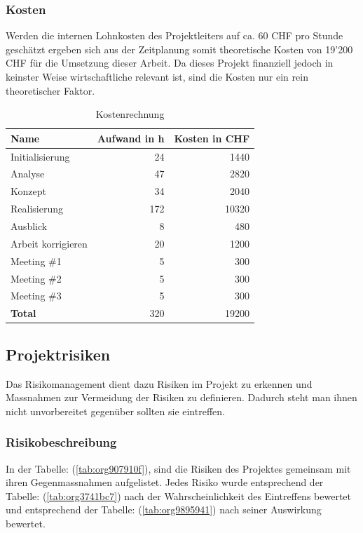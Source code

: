 \subsubsection{Kosten}
\label{sec:orgede2bc3}

Werden die internen Lohnkosten des Projektleiters auf ca. 60 CHF pro Stunde
geschätzt ergeben sich aus der Zeitplanung somit theoretische Kosten von 19'200
CHF für die Umsetzung dieser Arbeit. Da dieses Projekt finanziell jedoch in
keinster Weise wirtschaftliche relevant ist, sind die Kosten nur ein rein
theoretischer Faktor.
\begin{table}[htbp]
\centering
\begin{tabular}{lrr}
\hline
\textbf{Name}\cellcolor[HTML]{C0C0C0} & \textbf{Aufwand in h}\cellcolor[HTML]{C0C0C0} & \textbf{Kosten in CHF}\cellcolor[HTML]{C0C0C0}\\
\hline
Initialisierung & 24 & 1440\\
Analyse & 47 & 2820\\
Konzept & 34 & 2040\\
Realisierung & 172 & 10320\\
Ausblick & 8 & 480\\
Arbeit korrigieren & 20 & 1200\\
Meeting \#1 & 5 & 300\\
Meeting \#2 & 5 & 300\\
Meeting \#3 & 5 & 300\\
\hline
\textbf{Total} & 320 & 19200\\
\hline
\end{tabular}
\caption{\label{tab:org77a14fe}
Kostenrechnung}

\end{table}

\subsection{Projektrisiken}
\label{sec:org60b9ca4}

Das Risikomanagement dient dazu Risiken im Projekt zu erkennen und Massnahmen
zur Vermeidung der Risiken zu definieren. Dadurch steht man ihnen nicht
unvorbereitet gegenüber sollten sie eintreffen.

\subsubsection{Risikobeschreibung}
\label{sec:orgb3ef96b}

In der Tabelle: (\ref{tab:org907910f}), sind die Risiken des Projektes
gemeinsam mit ihren Gegenmassnahmen aufgelistet. Jedes Risiko wurde
entsprechend der Tabelle: (\ref{tab:org3741bc7}) nach der Wahrscheinlichkeit
des Eintreffens bewertet und entsprechend der Tabelle: (\ref{tab:org9895941}) nach
seiner Auswirkung bewertet.

